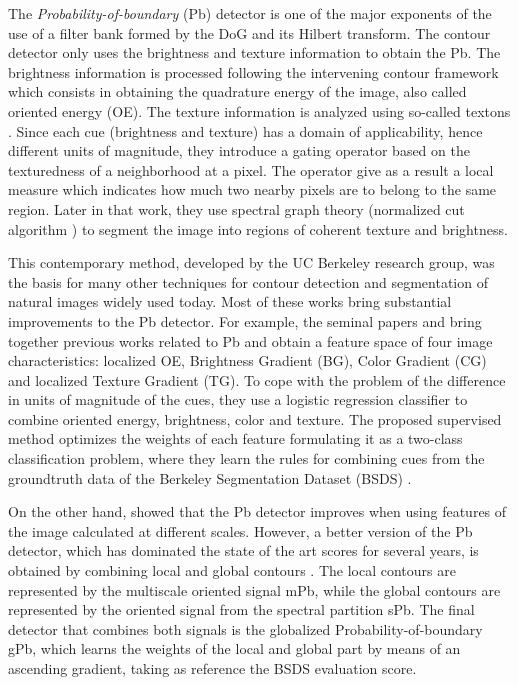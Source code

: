 The \textit{Probability-of-boundary} (Pb) detector \citep{Malik.Belongie.ea:IJCV:2001} is one of the major exponents of the use of a filter bank formed by the DoG and its Hilbert transform. The contour detector only uses the brightness and texture information to obtain the Pb. The brightness information is processed following the intervening contour framework \citep{Leung.Malik:ECCV:1998} which consists in obtaining the quadrature energy of the image, also called oriented energy (OE). The texture information is analyzed using so-called textons \citep{Malik.Belongie.ea:ICCV:1999}. Since each cue (brightness and texture) has a domain of applicability, hence different units of magnitude, they introduce a gating operator based on the texturedness of a neighborhood at a pixel. The operator give as a result a local measure which indicates how much two nearby pixels are to belong to the same region. Later in that work, they use spectral graph theory (normalized cut algorithm \citep{JianboShi.Malik:PAMI:2000}) to segment the image into regions of coherent texture and brightness.

This contemporary method, developed by the UC Berkeley research group, was the basis for many other techniques for contour detection and segmentation of natural images widely used today. Most of these works bring substantial improvements to the Pb detector. For example, the seminal papers \citep{Martin.Fowlkes.ea:NIPS:2002} and \citep{Martin.Fowlkes.ea:PAMI:2004} bring together previous works related to Pb and obtain a feature space of four image characteristics: localized OE, Brightness Gradient (BG), Color Gradient (CG) and localized Texture Gradient (TG). To cope with the problem of the difference in units of magnitude of the cues, they use a logistic regression classifier to combine oriented energy, brightness, color and texture. The proposed supervised method optimizes the weights of each feature formulating it as a two-class classification problem, where they learn the rules for combining cues from the groundtruth data of the Berkeley Segmentation Dataset (BSDS) \citep{Martin.Fowlkes.ea:ICCV:2001}.

On the other hand, \cite{Ren:ECCV:2008} showed that the Pb detector improves when using features of the image calculated at different scales. However, a better version of the Pb detector, which has dominated the state of the art scores for several years, is obtained by combining local and global contours \citep{Maire.Arbelaez.ea:CVPR:2008}. The local contours are represented by the multiscale oriented signal mPb, while the global contours are represented by the oriented signal from the spectral partition sPb. The final detector that combines both signals is the globalized Probability-of-boundary gPb, which learns the weights of the local and global part by means of an ascending gradient, taking as reference the BSDS evaluation score.

